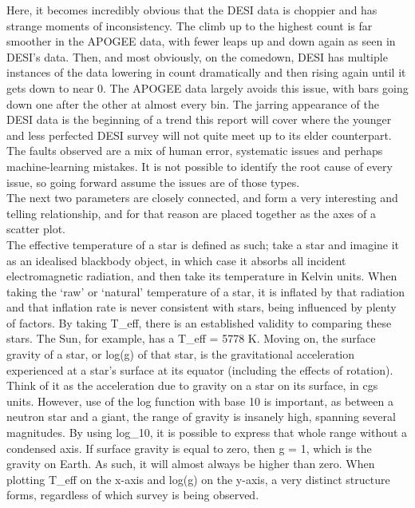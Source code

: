 \documentclass{article}
\begin{document}
\indent Here, it becomes incredibly obvious that the DESI data is choppier and has strange moments of inconsistency. The climb up to the highest count is far smoother in the APOGEE data, with fewer leaps up and down again as seen in DESI’s data. Then, and most obviously, on the comedown, DESI has multiple instances of the data lowering in count dramatically and then rising again until it gets down to near 0. The APOGEE data largely avoids this issue, with bars going down one after the other at almost every bin. The jarring appearance of the DESI data is the beginning of a trend this report will cover where the younger and less perfected DESI survey will not quite meet up to its elder counterpart. The faults observed are a mix of human error, systematic issues and perhaps machine-learning mistakes. It is not possible to identify the root cause of every issue, so going forward assume the issues are of those types.\\
\indent The next two parameters are closely connected, and form a very interesting and telling relationship, and for that reason are placed together as the axes of a scatter plot. \\
\indent The effective temperature of a star is defined as such; take a star and imagine it as an idealised blackbody object, in which case it absorbs all incident electromagnetic radiation, and then take its temperature in Kelvin units. When taking the ‘raw’ or ‘natural’ temperature of a star, it is inflated by that radiation and that inflation rate is never consistent with stars, being influenced by plenty of factors. By taking T\_eff, there is an established validity to comparing these stars. The Sun, for example, has a T\_eff = 5778 K. Moving on, the surface gravity of a star, or log(g) of that star, is the gravitational acceleration experienced at a star's surface at its equator (including the effects of rotation). Think of it as the acceleration due to gravity on a star on its surface, in cgs units. However, use of the log function with base 10 is important, as between a neutron star and a giant, the range of gravity is insanely high, spanning several magnitudes. By using log\_10, it is possible to express that whole range without a condensed axis. If surface gravity is equal to zero, then g = 1, which is the gravity on Earth. As such, it will almost always be higher than zero. When plotting T\_eff on the x-axis and log(g) on the y-axis, a very distinct structure forms, regardless of which survey is being observed.\\
\end{document}
